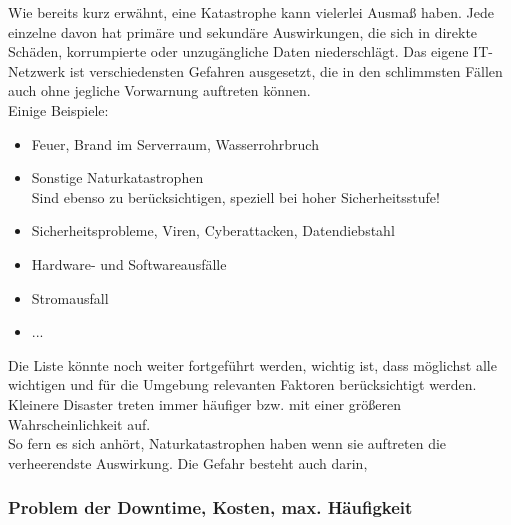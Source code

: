 \documentclass[letterpaper, 12pt]{article}
\let\tempsubsubsection\subsubsection
\renewcommand\subsubsection[1]{\vspace{0cm}\tempsubsubsection{#1}\vspace{0cm}}
\begin{document}
Wie bereits kurz erwähnt, eine Katastrophe kann vielerlei Ausmaß haben. Jede einzelne davon hat primäre und sekundäre Auswirkungen, die sich in direkte Schäden, korrumpierte oder unzugängliche Daten niederschlägt. Das eigene IT-Netzwerk ist verschiedensten Gefahren ausgesetzt, die in den schlimmsten Fällen auch ohne jegliche Vorwarnung auftreten können. \\
Einige Beispiele:

\begin{itemize}
	\item Feuer, Brand im Serverraum, Wasserrohrbruch
	\item Sonstige Naturkatastrophen \\ Sind ebenso zu berücksichtigen, speziell bei hoher Sicherheitsstufe!
	\item Sicherheitsprobleme, Viren, Cyberattacken, Datendiebstahl
	\item Hardware- und Softwareausfälle
	\item Stromausfall
	\item ...
\end{itemize}

Die Liste könnte noch weiter fortgeführt werden, wichtig ist, dass möglichst alle wichtigen und für die Umgebung relevanten Faktoren berücksichtigt werden. Kleinere Disaster treten immer häufiger bzw. mit einer größeren Wahrscheinlichkeit auf. \\
So fern es sich anhört, Naturkatastrophen haben wenn sie auftreten die verheerendste Auswirkung. Die Gefahr besteht auch darin, 

\newpage

\subsubsection{Problem der Downtime, Kosten, max. Häufigkeit}
\end{document}
